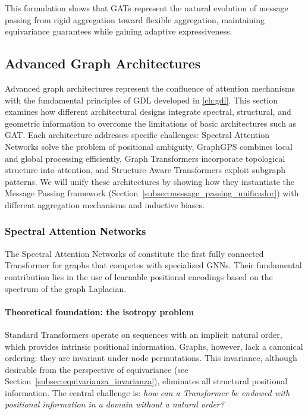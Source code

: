 This formulation shows that GATs represent the natural evolution of message passing from rigid aggregation toward flexible aggregation, maintaining equivariance guarantees while gaining adaptive expressiveness.

\subsection{Advanced Graph Architectures}\label{subsec:arquitecturas_avanzadas_grafos}

Advanced graph architectures represent the confluence of attention mechanisms with the fundamental principles of \gls{GDL} developed in \autoref{ch:gdl}. This section examines how different architectural designs integrate spectral, structural, and geometric information to overcome the limitations of basic architectures such as GAT. Each architecture addresses specific challenges: Spectral Attention Networks solve the problem of positional ambiguity, GraphGPS combines local and global processing efficiently, Graph \glspl{Transformer} incorporate topological structure into attention, and Structure-Aware \glspl{Transformer} exploit subgraph patterns. We will unify these architectures by showing how they instantiate the Message Passing framework (Section~\ref{subsec:message_passing_unificador}) with different aggregation mechanisms and inductive biases.

\subsubsection{Spectral Attention Networks}\label{subsubsec:san_advanced}

The Spectral Attention Networks of \citet{kreuzer2021spectral} constitute the first fully connected \gls{Transformer} for graphs that competes with specialized \glspl{GNN}. Their fundamental contribution lies in the use of learnable positional encodings based on the spectrum of the graph Laplacian.

\paragraph{Theoretical foundation: the isotropy problem}

Standard \glspl{Transformer} operate on sequences with an implicit natural order, which provides intrinsic positional information. Graphs, however, lack a canonical ordering: they are invariant under node permutations. This invariance, although desirable from the perspective of equivariance (see Section~\ref{subsec:equivarianza_invarianza}), eliminates all structural positional information. The central challenge is: \textit{how can a \gls{Transformer} be endowed with positional information in a domain without a natural order?}

